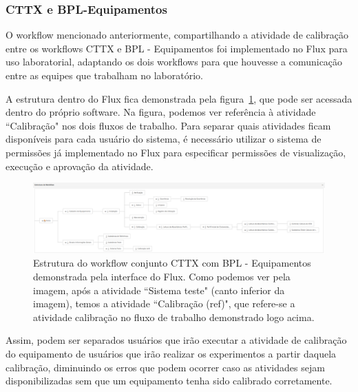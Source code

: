 \subsubsection{CTTX e BPL-Equipamentos}

O workflow mencionado anteriormente, compartilhando a atividade de calibração entre os workflows CTTX e BPL - Equipamentos foi implementado no Flux para uso laboratorial, adaptando os dois workflows para que houvesse a comunicação entre as equipes que trabalham no laboratório.

A estrutura dentro do Flux fica demonstrada pela figura~\ref{fig:cttx_bpl_flux}, que pode ser acessada dentro do próprio software. Na figura, podemos ver referência à atividade ``Calibração" nos dois fluxos de trabalho. Para separar quais atividades ficam disponíveis para cada usuário do sistema, é necessário utilizar o sistema de permissões já implementado no Flux para especificar permissões de visualização, execução e aprovação da atividade.

\begin{figure}
    \centering
    \includegraphics[width=1\textwidth]{imgs/CTTX-EQP/estrutura_cttx_eqp_flux.png}
    \caption{Estrutura do workflow conjunto CTTX com BPL - Equipamentos demonstrada pela interface do Flux. Como podemos ver pela imagem, após a atividade ``Sistema teste" (canto inferior da imagem), temos a atividade ``Calibração (ref)", que refere-se a atividade calibração no fluxo de trabalho demonstrado logo acima.}
    \label{fig:cttx_bpl_flux}
\end{figure}

Assim, podem ser separados usuários que irão executar a atividade de calibração do equipamento de usuários que irão realizar os experimentos a partir daquela calibração, diminuindo os erros que podem ocorrer caso as atividades sejam disponibilizadas sem que um equipamento tenha sido calibrado corretamente.

